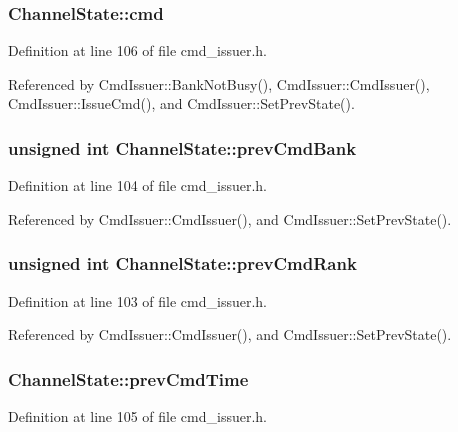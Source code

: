 \subsubsection[{cmd}]{ {\bf ChannelState::cmd}}\label{structChannelState_81e9e4a36e784e5438ad12e1e0a517d3}




Definition at line 106 of file cmd\_\-issuer.h.

Referenced by CmdIssuer::BankNotBusy(), CmdIssuer::CmdIssuer(), CmdIssuer::IssueCmd(), and CmdIssuer::SetPrevState().
\subsubsection[{prevCmdBank}]{\setlength{\rightskip}{0pt plus 5cm}unsigned int {\bf ChannelState::prevCmdBank}}\label{structChannelState_99e20faf9182a47cb540cb68b72f785f}




Definition at line 104 of file cmd\_\-issuer.h.

Referenced by CmdIssuer::CmdIssuer(), and CmdIssuer::SetPrevState().
\subsubsection[{prevCmdRank}]{\setlength{\rightskip}{0pt plus 5cm}unsigned int {\bf ChannelState::prevCmdRank}}\label{structChannelState_4e640c4ef850d6829f93250e61e36307}




Definition at line 103 of file cmd\_\-issuer.h.

Referenced by CmdIssuer::CmdIssuer(), and CmdIssuer::SetPrevState().
\subsubsection[{prevCmdTime}]{ {\bf ChannelState::prevCmdTime}}\label{structChannelState_50665e26c1a30623f91eee4653d3b4c1}




Definition at line 105 of file cmd\_\-issuer.h.

